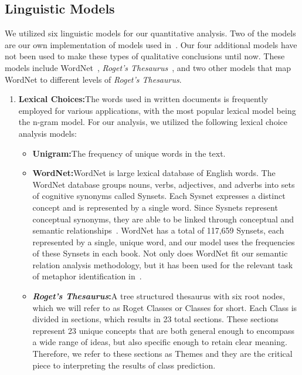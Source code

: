 \subsection*{Linguistic Models}\label{subsec:models}
We utilized six linguistic models for our quantitative analysis.
Two of the models are our own implementation of models used in~\cite{ashok2013}.
Our four additional models have not been used to make these types of qualitative conclusions until now. These models include WordNet~\cite{bird_klein_loper_2009}, \textit{Roget's Thesaurus}~\cite{roget}, and two other models that map WordNet to different levels of \textit{Roget's Thesaurus}.

\renewcommand{\labelenumi}{\bfseries\Roman{enumi}}
\begin{enumerate}[label=\Roman*,ref=\textbf{\thesection}]
    \item \textbf{Lexical Choices:\enspace}The words used in written documents is frequently employed for various applications, with the most popular lexical model being the n-gram model.
    For our analysis, we utilized the following lexical choice analysis models:
    \begin{itemize}
        \item \textbf{Unigram:\enspace}The frequency of unique words in the text.
        \item \textbf{WordNet:\enspace}WordNet is large lexical database of English words. The WordNet database groups nouns, verbs, adjectives, and adverbs into sets of cognitive synonyms called Synsets. Each Sysnet expresses a distinct concept and is represented by a single word. Since Sysnets represent conceptual synonyms, they are able to be linked through conceptual and semantic relationships~\cite{wordnet}.
        WordNet has a total of 117,659 Synsets, each represented by a single, unique word, and our model uses the frequencies of these Synsets in each book.
        Not only does WordNet fit our semantic relation analysis methodology, but it has been used for the relevant task of metaphor identification in~\cite{mao2018word}.
        \item \textbf{\textit{Roget's Thesaurus}:\enspace}A tree structured thesaurus with six root nodes, which we will refer to as Roget Classes or Classes for short.
        Each Class is divided in sections, which results in 23 total sections.
        These sections represent 23 unique concepts that are both general enough to encompass a wide range of ideas, but also specific enough to retain clear meaning.
        Therefore, we refer to these sections as Themes and they are the critical piece to interpreting the results of class prediction.

\end{itemize}
\end{enumerate}
